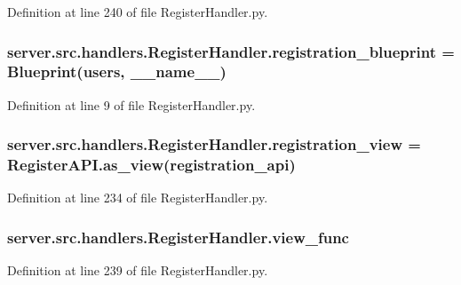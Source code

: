 Definition at line 240 of file Register\+Handler.\+py.

\subsubsection[{\texorpdfstring{registration\+\_\+blueprint}{registration_blueprint}}]{\setlength{\rightskip}{0pt plus 5cm}server.\+src.\+handlers.\+Register\+Handler.\+registration\+\_\+blueprint = Blueprint(\textquotesingle{}users\textquotesingle{}, \+\_\+\+\_\+name\+\_\+\+\_\+)}\hypertarget{namespaceserver_1_1src_1_1handlers_1_1_register_handler_afce21eacbe2ae16cdf4637aed324a93b}{}\label{namespaceserver_1_1src_1_1handlers_1_1_register_handler_afce21eacbe2ae16cdf4637aed324a93b}


Definition at line 9 of file Register\+Handler.\+py.

\subsubsection[{\texorpdfstring{registration\+\_\+view}{registration_view}}]{\setlength{\rightskip}{0pt plus 5cm}server.\+src.\+handlers.\+Register\+Handler.\+registration\+\_\+view = Register\+A\+P\+I.\+as\+\_\+view(\textquotesingle{}registration\+\_\+api\textquotesingle{})}\hypertarget{namespaceserver_1_1src_1_1handlers_1_1_register_handler_aaf26ae647614acc866fbb90882f4e3c8}{}\label{namespaceserver_1_1src_1_1handlers_1_1_register_handler_aaf26ae647614acc866fbb90882f4e3c8}


Definition at line 234 of file Register\+Handler.\+py.

\subsubsection[{\texorpdfstring{view\+\_\+func}{view_func}}]{\setlength{\rightskip}{0pt plus 5cm}server.\+src.\+handlers.\+Register\+Handler.\+view\+\_\+func}\hypertarget{namespaceserver_1_1src_1_1handlers_1_1_register_handler_a6be70d95ab826685feb65087c99c514b}{}\label{namespaceserver_1_1src_1_1handlers_1_1_register_handler_a6be70d95ab826685feb65087c99c514b}


Definition at line 239 of file Register\+Handler.\+py.

